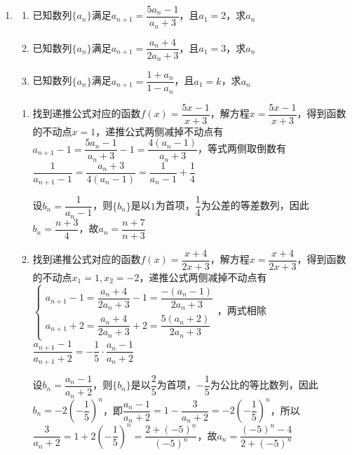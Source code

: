 \begin{enumerate}
\begin{jieda}
\begin{enumerate}
            \ps 当$A = 1$时为等差数列，除常数列外，对应函数不存在不动点，因此不适用.
        \end{enumerate}
    \end{jieda}
    \item 
    \begin{enumerate}
        \item 已知数列$\{a_n\}$满足$a_{n+1} = \dfrac{5a_n-1}{a_n+3}$，且$a_1 = 2$，求$a_n$
        \item 已知数列$\{a_n\}$满足$a_{n+1} = \dfrac{a_n+4}{2a_n+3}$，且$a_1 = 3$，求$a_n$
        \item 已知数列$\{a_n\}$满足$a_{n+1} = \dfrac{1+a_n}{1-a_n}$，且$a_1 = k$，求$a_n$
    \end{enumerate}
    
    \begin{jieda}
        \begin{enumerate}
            \item 找到递推公式对应的函数$f(x) = \dfrac{5x-1}{x+3}$，解方程$x = \dfrac{5x-1}{x+3}$，得到函数的不动点$x = 1$，递推公式两侧减掉不动点有$a_{n+1} - 1 = \dfrac{5a_n-1}{a_n+3} - 1 = \dfrac{4(a_n-1)}{a_n+3}$，等式两侧取倒数有$\dfrac{1}{a_{n+1} - 1} = \dfrac{a_n+3}{4(a_n - 1)} = \dfrac{1}{a_n - 1} + \dfrac{1}{4}$

            设$b_n = \dfrac{1}{a_n - 1}$，则$\{b_n\}$是以$1$为首项，$\dfrac{1}{4}$为公差的等差数列，因此$b_n = \dfrac{n+3}{4}$，故$a_n = \dfrac{n+7}{n+3}$
            
            \item 找到递推公式对应的函数$f(x) = \dfrac{x+4}{2x+3}$，解方程$x = \dfrac{x+4}{2x+3}$，得到函数的不动点$x_1 = 1, x_2 = -2$，递推公式两侧减掉不动点有$\left\{\begin{array}{l}
             a_{n+1}-1 = \dfrac{a_n+4}{2a_n+3} - 1 = \dfrac{-(a_n-1)}{2a_n+3} \\
             a_{n+1}+2 = \dfrac{a_n+4}{2a_n+3} + 2 = \dfrac{5(a_n+2)}{2a_n+3}
            \end{array}\right.$，两式相除$\dfrac{a_{n+1}-1}{a_{n+1}+2} = -\dfrac{1}{5} \cdot \dfrac{a_n-1}{a_n+2}$
            
            设$b_n = \dfrac{a_n - 1}{a_n+2}$，则$\{b_n\}$是以$\dfrac{2}{5}$为首项，$-\dfrac{1}{5}$为公比的等比数列，因此$b_n = -2\left(-\dfrac{1}{5}\right)^n$，即$\dfrac{a_n - 1}{a_n+2} = 1 - \dfrac{3}{a_n+2} = -2\left(-\dfrac{1}{5}\right)^n$，所以$\dfrac{3}{a_n+2} = 1+2\left(-\dfrac{1}{5}\right)^n = \dfrac{2+(-5)^n}{(-5)^n}$，故$a_n = \dfrac{(-5)^n - 4}{2+(-5)^n}$


\end{enumerate}
\end{jieda}
\end{enumerate}
